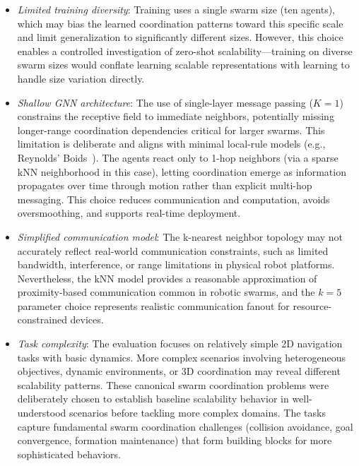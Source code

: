 \begin{itemize}
    \item \emph{Limited training diversity}: 
    Training uses a single swarm size (ten agents), 
    which may bias the learned coordination patterns toward this specific scale and limit generalization to significantly different sizes.
    However, 
    this choice enables a controlled investigation of 
    zero-shot scalability---training on diverse swarm sizes would conflate learning scalable representations with learning to handle size variation directly.
    
    \item \emph{Shallow GNN architecture}: The use of single-layer message passing (\(K{=}1\)) 
    constrains the receptive field to immediate neighbors, 
    potentially missing longer-range coordination dependencies critical for larger swarms.
    This limitation is deliberate and aligns with minimal local-rule models (e.g., Reynolds' Boids~\cite{DBLP:conf/siggraph/Reynolds87}). The agents react only to 1-hop neighbors (via a sparse kNN neighborhood in this case), 
    letting coordination emerge as information propagates over time through motion rather than explicit multi-hop messaging.
    This choice reduces communication and computation, 
    avoids oversmoothing, and supports real-time deployment.

    \item \emph{Simplified communication model}: The k-nearest neighbor topology may not accurately reflect real-world communication constraints, such as limited bandwidth, interference, or range limitations in physical robot platforms.
    Nevertheless, the kNN model provides a reasonable approximation of proximity-based communication common in robotic swarms, 
    and the \(k=5\) parameter choice represents realistic communication fanout for resource-constrained devices.
    
    \item \emph{Task complexity}: The evaluation focuses on relatively simple 2D navigation tasks with basic dynamics. 
    More complex scenarios involving heterogeneous objectives, dynamic environments,
    or 3D coordination may reveal different scalability patterns.
    These canonical swarm coordination problems were deliberately chosen to establish baseline scalability behavior 
    in well-understood scenarios before tackling more complex domains.
    The tasks capture fundamental swarm coordination challenges (collision avoidance, goal convergence, formation maintenance) that form building blocks for more sophisticated behaviors.
    

\end{itemize}
